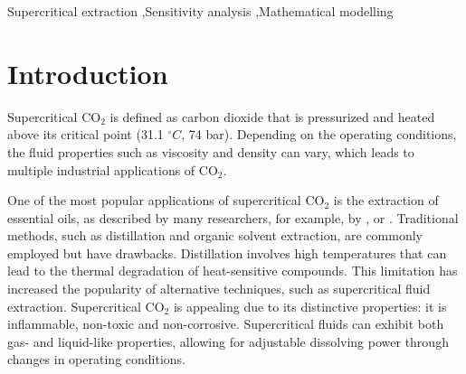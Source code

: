 \documentclass[a4paper,fleqn]{cas-dc}
\begin{document}
	\begin{keywords}
		Supercritical extraction \sep Sensitivity analysis \sep Mathematical modelling
	\end{keywords}
	
	\maketitle
	
	
	\section{Introduction}
	
	Supercritical CO$_2$ is defined as carbon dioxide that is pressurized and heated above its critical point (31.1 $^\circ C$, 74 bar). Depending on the operating conditions, the fluid properties such as viscosity and density can vary, which leads to multiple industrial applications of CO$_2$.
	
	One of the most popular applications of supercritical CO$_2$ is the extraction of essential oils, as described by many researchers, for example, by \citet{Sodeifian2017}, \citet{Reverchon1993} or \citet{Sovova1994}. Traditional methods, such as distillation and organic solvent extraction, are commonly employed but have drawbacks. Distillation involves high temperatures that can lead to the thermal degradation of heat-sensitive compounds. This limitation has increased the popularity of alternative techniques, such as supercritical fluid extraction. Supercritical CO$_2$ is appealing due to its distinctive properties: it is inflammable, non-toxic and non-corrosive. Supercritical fluids can exhibit both gas- and liquid-like properties, allowing for adjustable dissolving power through changes in operating conditions.
	
\end{document}
